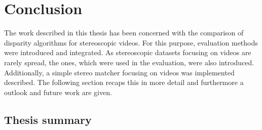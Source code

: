\chapter{Conclusion}
\label{chap:conclusion}

The work described in this thesis has been concerned with the comparison of disparity algorithms for stereoscopic videos.
For this purpose, evaluation methods were introduced and integrated.
As stereoscopic datasets focusing on videos are rarely spread, the ones, which were used in the evaluation, were also introduced.
Additionally, a simple stereo matcher focusing on videos was implemented described.
The following section recaps this in more detail and furthermore a outlook and future work are given.

\section{Thesis summary}

